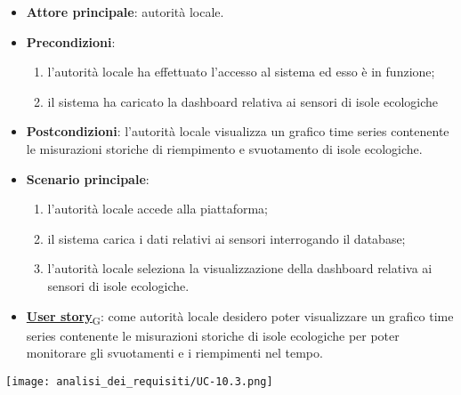 \begin{itemize}
	\item \textbf{Attore principale}: autorità locale.
	\item \textbf{Precondizioni}:
	      \begin{enumerate}
		      \item l'autorità locale ha effettuato l'accesso al sistema ed esso è in funzione;
		      \item il sistema ha caricato la dashboard relativa ai sensori di isole ecologiche
	      \end{enumerate}
	\item \textbf{Postcondizioni}: l'autorità locale visualizza un grafico time series contenente le misurazioni storiche di riempimento e svuotamento
	      di isole ecologiche.
	\item \textbf{Scenario principale}:
	      \begin{enumerate}
		      \item l'autorità locale accede alla piattaforma;
		      \item il sistema carica i dati relativi ai sensori interrogando il database;
		      \item l'autorità locale seleziona la visualizzazione della dashboard relativa ai sensori di isole ecologiche.
	      \end{enumerate}
	\item \href{https://7last.github.io/docs/rtb/documentazione-interna/glossario\#user-story}{\textbf{User story}\textsubscript{G}}:
	      come autorità locale desidero poter visualizzare un grafico time series contenente le misurazioni storiche
	      di isole ecologiche per poter monitorare gli svuotamenti e i riempimenti nel tempo.
\end{itemize}
\begin{center}
	\texttt{[image: analisi\_dei\_requisiti/UC-10.3.png]}
\end{center}


